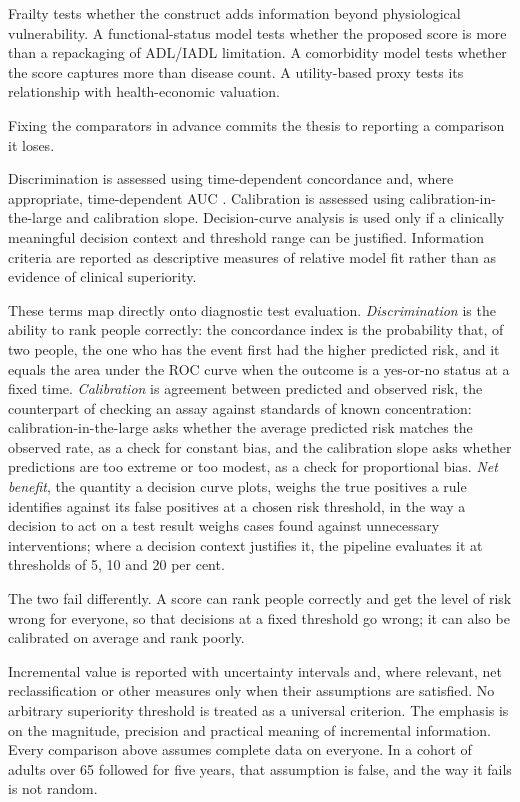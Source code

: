 Frailty tests whether the construct adds information beyond physiological vulnerability. A functional-status model tests whether the proposed score is more than a repackaging of ADL/IADL limitation. A comorbidity model tests whether the score captures more than disease count. A utility-based proxy tests its relationship with health-economic valuation.

Fixing the comparators in advance commits the thesis to reporting a comparison it loses.

Discrimination is assessed using time-dependent concordance and, where appropriate, time-dependent AUC \citep{harrell_1996,uno_2011,blanche_2013}. Calibration is assessed using calibration-in-the-large and calibration slope. Decision-curve analysis is used only if a clinically meaningful decision context and threshold range can be justified. Information criteria are reported as descriptive measures of relative model fit rather than as evidence of clinical superiority.

These terms map directly onto diagnostic test evaluation. \emph{Discrimination} is the ability to rank people correctly: the concordance index is the probability that, of two people, the one who has the event first had the higher predicted risk, and it equals the area under the ROC curve when the outcome is a yes-or-no status at a fixed time. \emph{Calibration} is agreement between predicted and observed risk, the counterpart of checking an assay against standards of known concentration: calibration-in-the-large asks whether the average predicted risk matches the observed rate, as a check for constant bias, and the calibration slope asks whether predictions are too extreme or too modest, as a check for proportional bias. \emph{Net benefit}, the quantity a decision curve plots, weighs the true positives a rule identifies against its false positives at a chosen risk threshold, in the way a decision to act on a test result weighs cases found against unnecessary interventions; where a decision context justifies it, the pipeline evaluates it at thresholds of 5, 10 and 20 per cent.

The two fail differently. A score can rank people correctly and get the level of risk wrong for everyone, so that decisions at a fixed threshold go wrong; it can also be calibrated on average and rank poorly.

Incremental value is reported with uncertainty intervals and, where relevant, net reclassification or other measures only when their assumptions are satisfied. No arbitrary superiority threshold is treated as a universal criterion. The emphasis is on the magnitude, precision and practical meaning of incremental information.
Every comparison above assumes complete data on everyone. In a cohort of adults over 65 followed for five years, that assumption is false, and the way it fails is not random.


